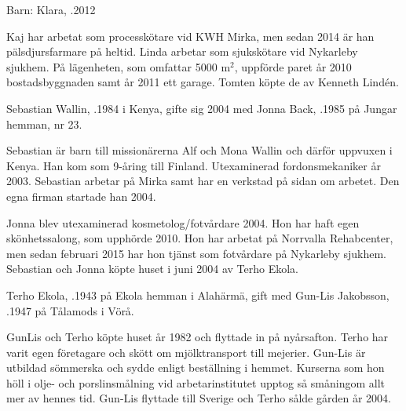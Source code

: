 Barn: Klara, .2012

Kaj har arbetat som processkötare vid KWH Mirka, men sedan 2014  är	han pälsdjursfarmare på heltid. Linda arbetar som sjukskötare vid Nykarleby sjukhem. På lägenheten, som omfattar 5000 m$^2$, uppförde paret  år 2010 bostadsbyggnaden samt år 2011 ett garage. Tomten köpte de av Kenneth Lindén.






Sebastian Wallin, .1984 i Kenya, gifte sig 2004 med Jonna Back, .1985 på Jungar hemman, nr 23.
\begin{jhchildren}
  \item {}
  \item {}
  \item {}
\end{jhchildren}

Sebastian är barn till missionärerna Alf och Mona Wallin och därför	uppvuxen i Kenya. Han kom som 9-åring till Finland. Utexaminerad fordonsmekaniker år 2003. Sebastian arbetar på Mirka samt har en verkstad på sidan om arbetet. Den egna firman startade han 2004.

Jonna blev utexaminerad kosmetolog/fotvårdare 2004. Hon har haft egen skönhetssalong, som upphörde 2010. Hon har arbetat på Norrvalla Rehabcenter, men sedan februari 2015 har hon tjänst som fotvårdare på Nykarleby sjukhem. Sebastian och Jonna köpte huset i juni 2004  av Terho Ekola.


Terho Ekola, .1943 på Ekola hemman i Alahärmä, gift med Gun-Lis Jakobsson, .1947 på Tålamods i Vörå.
\begin{jhchildren}
  \item {}
  \item {}
  \item {}
\end{jhchildren}
GunLis och Terho köpte huset år 1982 och flyttade in på nyårsafton. Terho har varit egen företagare och skött om mjölktransport till mejerier. Gun-Lis är utbildad sömmerska och sydde enligt beställning i hemmet. Kurserna som hon höll i olje- och porslinsmålning vid arbetarinstitutet upptog så småningom allt mer av hennes tid. Gun-Lis flyttade till Sverige och Terho sålde gården år 2004.


